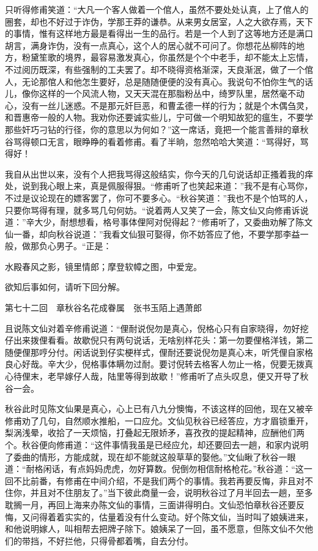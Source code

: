 \documentclass[12pt,UTF8]{ctexbook}
\begin{document}
{{{只听得修甫笑道：“大凡一个客人做着一个倌人，虽然不要处处认真，上了倌人的圈套，却也不好过于诈伪，学那王莽的谦恭。从来男女居室，人之大欲存焉，天下的事情，惟有这样地方最是看得出一生的品行。若是一个人到了这等地方还是满口胡言，满身诈伪，没有一点真心，这个人的居心就不可问了。你想花丛柳阵的地方，粉黛笙歌的境界，最容易激发真心，你虽然是个个中老手，却不能太上忘情，不过阅历既深，有些强制的工夫罢了。却不晓得资格渐深，天良渐泯，做了一个倌人，无论那倌人和他怎生要好，总是随随便便的没有真心。我说句不怕你生气的话儿，像你这样的一个风流人物，又天天混在那脂粉丛中，绮罗队里，居然毫不动心，没有一丝儿迷惑。不是那元奸巨恶，和曹孟德一样的行为；就是个木偶刍灵，和晋惠帝一般的人物。我劝你还要诚实些儿，宁可做一个明知故犯的瘟生，不要学那些奸巧刁钻的行径，你的意思以为何如？”这一席话，竟把一个能言善辩的章秋谷骂得顿口无言，眼睁睁的看着修甫。看了半晌，忽然哈哈大笑道：“骂得好，骂得好！

我自从出世以来，没有个人把我骂得这般结实，你今天的几句说话却正搔着我的痒处，说到我心眼上来，真是佩服得狠。“修甫听了也笑起来道：”我不是有心骂你，不过是议论现在的嫖客罢了，你可不要多心。“秋谷笑道：”我也不是个怕骂的人，只要你骂得有理，就多骂几句何妨。“说着两人又笑了一会，陈文仙又向修甫诉说道：”辛大少，耐想想看，格号事体俚阿对倪得起？“修甫听了，又委曲劝解了陈文仙一番，却向秋谷说道：”我看文仙狠可娶得，你不妨答应了他，不要学那李益一般，做那负心男子。“正是：

水殿春风之影，镜里情郎；摩登软幛之图，中爱宠。

欲知后事如何，请听下回分解。





第七十二回　章秋谷名花成眷属　张书玉陌上遇萧郎





且说陈文仙对着辛修甫说道：“俚耐说倪勿是真心，倪格心只有自家晓得，勿好挖仔出来拨俚看看。故歇倪只有两句说话，无啥别样花头：第一勿要俚格洋钱，第二随便俚那哼分付。闲话说到仔实梗样式，俚耐还要说倪勿是真心末，听凭俚自家格良心好哉。辛大少，倪格事体瞒勿过耐。要讨倪转去格客人勿止一格，倪要无拨真心待俚末，老早嫁仔人哉，陆里等得到故歇！”修甫听了点头叹息，便又开导了秋谷一会。

秋谷此时见陈文仙果是真心，心上已有八九分懊悔，不该这样的回他，现在又被辛修甫劝了几句，自然顺水推船，一口应允。文仙见秋谷已经答应，方才眉锁重开，梨涡浅晕，收拾了一天烦恼，打叠起无限娇矛，喜孜孜的提起精神，应酬他们两个。秋谷便向修甫道：“这件事情我虽是已经应允，却还要回去一趟，和家内说明了委曲的情形，方能成就，现在却不能就这般草草的娶他。”文仙瞅了秋谷一眼道：“耐格闲话，有点妈妈虎虎，勿好算数。倪倒勿相信耐格枪花。”秋谷道：“这一回不比前番，有修甫在中间介绍，不是我们两个的事情。我若再要反悔，非且对不住你，并且对不住朋友了。”当下彼此商量一会，说明秋谷过了月半回去一趟，至多耽搁一月，再回上海来办陈文仙的事情，三面讲得明白。文仙恐怕章秋谷还要反悔，又问得着着实实的，估量着没有什么变动。好个陈文仙，当时叫了娘姨进来，和他说明嫁人，叫相帮去把牌子除下。娘姨呆了一回，虽不愿意，但陈文仙不欠他们的带挡，不好拦他，只得骨都着嘴，自去分付。

}}}
\end{document}
